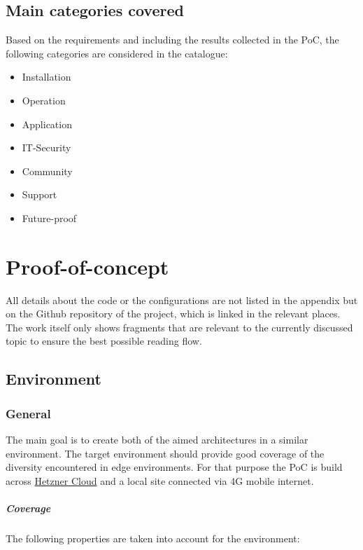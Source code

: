 \documentclass[MIC,Master,english]{twbook}%
\begin{document}
\section{Main categories covered}
Based on the requirements and including the results collected in the \ac{PoC}, the following categories are considered in the catalogue:

\begin{itemize}
    \itemsep0em
    \item Installation
    \item Operation
    \item Application
    \item IT-Security
    \item Community
    \item Support
    \item Future-proof
\end{itemize}


\pagebreak
\chapter{Proof-of-concept}
\label{chap:dsr}

All details about the code or the configurations are not listed in the appendix but on the Github repository \cite{bk-gh-repo} of the project, which is linked in the relevant places. The work itself only shows fragments that are relevant to the currently discussed topic to ensure the best possible reading flow.

\section{Environment}
\label{sec:dsrenv}
\subsection{General}
The main goal is to create both of the aimed architectures in a similar environment. The target environment should provide good coverage of the diversity encountered in edge environments. For that purpose the \ac{PoC} is build across \hyperref{https://www.hetzner.com/cloud}{}{}{Hetzner Cloud} \cite{hetzner-cloud} and a local site connected via 4G mobile internet.

\paragraph{Coverage} The following properties are taken into account for the environment:
\end{document}
